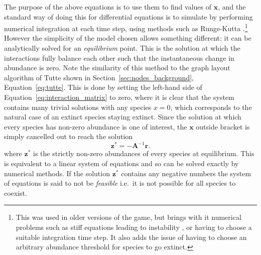 The purpose of the above equations is to use them to find values of $\mathbf{x}$, and the standard way of doing this for differential equations is to simulate by performing numerical integration at each time step, using methods such as Runge-Kutta \cite{Press2007Runge}.\footnote{This was used in older versions of the game, but brings with it numerical problems such as stiff equations leading to instability \cite{Press2007Runge}, or having to choose a suitable integration time step. It also adds the issue of having to choose an arbitrary abundance threshold for species to go extinct.}
However the simplicity of the model chosen allows something different: it can be analytically solved for an \emph{equilibrium} point. This is the solution at which the interactions fully balance each other such that the instantaneous change in abundance is zero. Note the similarity of this method to the graph layout algorithm of Tutte shown in Section~\ref{sec:nodes_background}, Equation~\eqref{eq:tutte}.
This is done by setting the left-hand side of Equation~\eqref{eq:interaction_matrix} to zero, where it is clear that the system contains many trivial solutions with any species $x=0$, which corresponds to the natural case of an extinct species staying extinct.
Since the solution at which every species has non-zero abundance is one of interest, the $\mathbf{x}$ outside bracket is simply cancelled out to reach the solution
\begin{equation}
  \mathbf{z^*} = -\mathbf{A}^{-1}\mathbf{r}.
  \label{eq:equilibrium}
\end{equation}
where $\mathbf{z}^*$ is the strictly non-zero abundances of every species at equilibrium.
This is equivalent to a linear system of equations and so can be solved exactly by numerical methods.
If the solution $\mathbf{z^*}$ contains any negative numbers the system of equations is said to not be \emph{feasible} i.e.\ it is not possible for all species to coexist.

